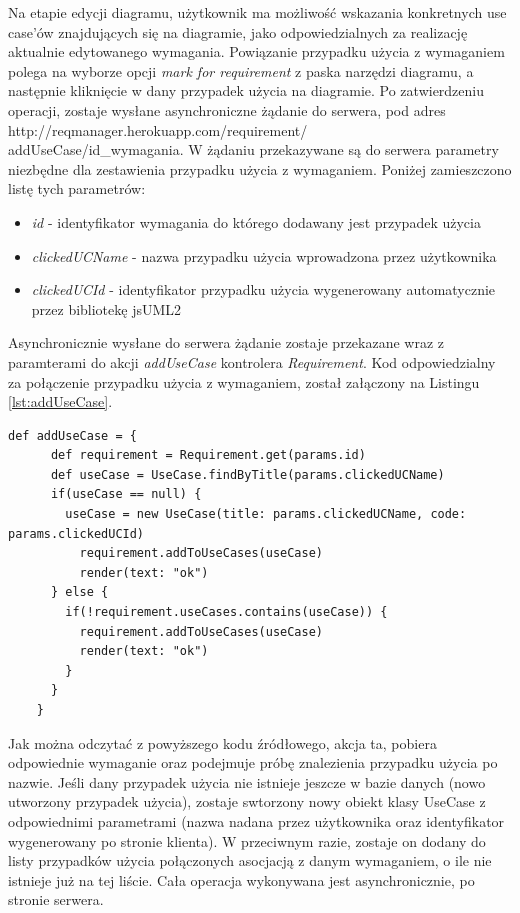       Na etapie edycji diagramu, użytkownik ma możliwość wskazania konkretnych use case'ów znajdujących się na diagramie, jako odpowiedzialnych za realizację aktualnie edytowanego wymagania. Powiązanie przypadku użycia z wymaganiem polega na wyborze opcji \emph{mark for requirement} z paska narzędzi diagramu, a następnie kliknięcie w dany przypadek użycia na diagramie. Po zatwierdzeniu operacji, zostaje wysłane asynchroniczne żądanie do serwera, pod adres http://reqmanager.herokuapp.com/requirement/\\addUseCase/id\_wymagania. W żądaniu przekazywane są do serwera parametry niezbędne dla zestawienia przypadku użycia z wymaganiem. Poniżej zamieszczono listę tych parametrów:

    \begin{itemize}
      \item \emph{id} - identyfikator wymagania do którego dodawany jest przypadek użycia
      \item \emph{clickedUCName} - nazwa przypadku użycia wprowadzona przez użytkownika
      \item \emph{clickedUCId} - identyfikator przypadku użycia wygenerowany automatycznie przez bibliotekę jsUML2
    \end{itemize}

    Asynchronicznie wysłane do serwera żądanie zostaje przekazane wraz z paramterami do akcji \emph{addUseCase} kontrolera \emph{Requirement}. Kod odpowiedzialny za połączenie przypadku użycia z wymaganiem, został załączony na Listingu \ref{lst:addUseCase}.

    \begin{lstlisting}[caption={Kod łączący przypadek użycia z wymaganiem}, label={lst:addUseCase}]
    def addUseCase = {
      def requirement = Requirement.get(params.id)
      def useCase = UseCase.findByTitle(params.clickedUCName)
      if(useCase == null) {
        useCase = new UseCase(title: params.clickedUCName, code: params.clickedUCId)
          requirement.addToUseCases(useCase)
          render(text: "ok")
      } else {
        if(!requirement.useCases.contains(useCase)) {
          requirement.addToUseCases(useCase)
          render(text: "ok")
        } 
      }
    }
    \end{lstlisting}

    Jak można odczytać z powyższego kodu źródłowego, akcja ta, pobiera odpowiednie wymaganie oraz podejmuje próbę znalezienia przypadku użycia po nazwie. Jeśli dany przypadek użycia nie istnieje jeszcze w bazie danych (nowo utworzony przypadek użycia), zostaje swtorzony nowy obiekt klasy UseCase z odpowiednimi parametrami (nazwa nadana przez użytkownika oraz identyfikator wygenerowany po stronie klienta). W przeciwnym razie, zostaje on dodany do listy przypadków użycia połączonych asocjacją z danym wymaganiem, o ile nie istnieje już na tej liście. Cała operacja wykonywana jest asynchronicznie, po stronie serwera. 

